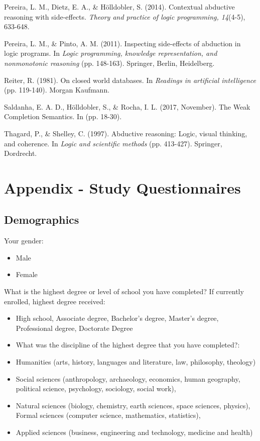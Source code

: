 \documentclass[]{interact}
\theoremstyle{plain}%
\theoremstyle{definition}
\theoremstyle{remark}
\begin{document}
Pereira, L. M., Dietz, E. A., \& Hölldobler, S. (2014). Contextual abductive reasoning with side-effects. \emph{Theory and practice of logic programming, 14}(4-5), 633-648.

Pereira, L. M., \& Pinto, A. M. (2011). Inspecting side-effects of abduction in logic programs. In \emph{Logic programming, knowledge representation, and nonmonotonic reasoning} (pp. 148-163). Springer, Berlin, Heidelberg.

Reiter, R. (1981). On closed world databases. In \emph{Readings in artificial intelligence} (pp. 119-140). Morgan Kaufmann.

Saldanha, E. A. D., Hölldobler, S., \& Rocha, I. L. (2017, November). The Weak Completion Semantics. In  (pp. 18-30).

Thagard, P., \& Shelley, C. (1997). Abductive reasoning: Logic, visual thinking, and coherence. In \emph{Logic and scientific methods} (pp. 413-427). Springer, Dordrecht.



\section{Appendix - Study Questionnaires}
\subsection{Demographics}

Your gender:
\begin{itemize}
\item Male
\item Female
\end{itemize}

What is the highest degree or level of school you have completed? If currently enrolled, highest degree received: 
\begin{itemize}
\item High school, Associate degree, Bachelor's degree, Master's degree, Professional degree, Doctorate Degree
\item What was the discipline of the highest degree that you have completed?:
\item 
Humanities (arts, history, languages and literature, law, philosophy, theology)
\item 
Social sciences (anthropology, archaeology, economics, human geography, political science, psychology, sociology, social work),
\item 
Natural sciences (biology, chemistry, earth sciences, space sciences, physics),
Formal sciences (computer science, mathematics, statistics),
\item 
Applied sciences (business, engineering and technology, medicine and health)
\end{itemize}
\end{document}
